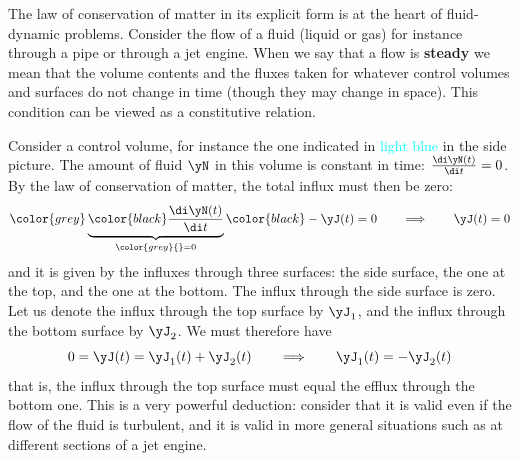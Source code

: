 \label{nsec:fluid_dyn_areavel}

The law of conservation of matter in its explicit form is at the heart of fluid-dynamic problems. Consider the flow of a fluid (liquid or gas) for instance through a pipe or through a jet engine. When we say that a flow is \textbf{steady} we mean that the volume contents and the fluxes taken for whatever control volumes and surfaces do not change in time (though they may change in space). This condition can be viewed as a constitutive relation.

%
%
Consider a control volume, for instance the one indicated in \textcolor{cyan}{light blue} in the side picture. The amount of fluid $\yN$ in this volume is constant in time: $\frac{\di\yN(t)}{\di t}=0$. By the law of conservation of matter, the total influx must then be zero:
\begin{equation*}
  {\color{grey}\underbrace{\color{black}\frac{\di\yN(t)}{\di t}}_{\color{grey}{}=0}\color{black}} - \yJ(t) = 0
  \qquad\Longrightarrow\qquad
  \yJ(t) = 0
\end{equation*}
and it is given by the influxes through three surfaces: the side surface, the one at the top, and the one at the bottom. The influx through the side surface is zero. Let us denote the influx through the top surface by $\yJ_{1}$, and the influx through the bottom surface by $\yJ_{2}$. We must therefore have
\begin{equation*}
  0 = \yJ(t) = \yJ_{1}(t) + \yJ_{2}(t)
  \qquad\Longrightarrow\qquad
  \yJ_{1}(t) = -\yJ_{2}(t)
\end{equation*}
%
%
that is, the influx through the top surface must equal the efflux through the bottom one.
This is a very powerful deduction: consider that it is valid even if the flow of the fluid is turbulent, and it is valid in more general situations such as at different sections of a jet engine.

